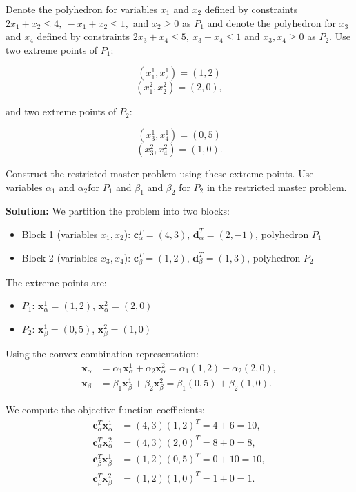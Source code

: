 \documentclass[11pt]{article}
\newcommand{\mb}[1]{\ensuremath{\boldsymbol{#1}}}
\begin{document}
\begin{enumerate}
Denote the polyhedron for variables $x_1$ and $x_2$ defined by constraints $2x_1 + x_2\le 4,\ -x_1 + x_2 \le 1,$ and $x_2 \ge 0$ as $P_1$ and denote
the polyhedron for $x_3$ and $x_4$ defined by constraints $2x_3 + x_4 \le 5,\ x_3 - x_4 \le 1$ and $x_3 , x_4 \ge 0$ as $P_2.$ Use two extreme points of
$P_1:$

$$
(x_1^1, x_2^1) = (1, 2)
$$
$$
(x^2_1, x^2_2) = (2, 0),
$$

and two extreme points of $P_2:$

$$
(x^1_3, x^1_4) = (0, 5)
$$
$$
(x^2_3, x^2_4) = (1, 0).
$$ 

Construct the restricted master problem using these extreme points. Use variables $\alpha_1$ and $\alpha_2$for $P_1$ and $\beta_1$ and $\beta_2$ for $P_2$ in the restricted master problem.

\textbf{Solution:} We partition the problem into two blocks:
\begin{itemize}
\item Block 1 (variables $x_1, x_2$): $\mb{c}_\alpha^T = (4, 3)$, $\mb{d}_\alpha^T = (2, -1)$, polyhedron $P_1$
\item Block 2 (variables $x_3, x_4$): $\mb{c}_\beta^T = (1, 2)$, $\mb{d}_\beta^T = (1, 3)$, polyhedron $P_2$
\end{itemize}

The extreme points are:
\begin{itemize}
\item $P_1$: $\mb{x}_\alpha^1 = (1, 2)$, $\mb{x}_\alpha^2 = (2, 0)$
\item $P_2$: $\mb{x}_\beta^1 = (0, 5)$, $\mb{x}_\beta^2 = (1, 0)$
\end{itemize}

Using the convex combination representation:
\begin{align*}
\mb{x}_\alpha &= \alpha_1 \mb{x}_\alpha^1 + \alpha_2 \mb{x}_\alpha^2 = \alpha_1(1, 2) + \alpha_2(2, 0), \\
\mb{x}_\beta &= \beta_1 \mb{x}_\beta^1 + \beta_2 \mb{x}_\beta^2 = \beta_1(0, 5) + \beta_2(1, 0).
\end{align*}

We compute the objective function coefficients:
\begin{align*}
\mb{c}_\alpha^T \mb{x}_\alpha^1 &= (4, 3)(1, 2)^T = 4 + 6 = 10, \\
\mb{c}_\alpha^T \mb{x}_\alpha^2 &= (4, 3)(2, 0)^T = 8 + 0 = 8, \\
\mb{c}_\beta^T \mb{x}_\beta^1 &= (1, 2)(0, 5)^T = 0 + 10 = 10, \\
\mb{c}_\beta^T \mb{x}_\beta^2 &= (1, 2)(1, 0)^T = 1 + 0 = 1.
\end{align*}


\end{enumerate}
\end{document}

